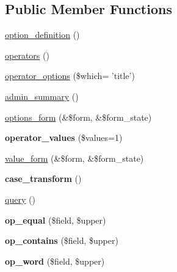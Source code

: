 \subsection*{Public Member Functions}
\begin{CompactItemize}
\item 
\hyperlink{classviews__handler__filter__string_12b7ca0453039900efde58e2c14bf0c8}{option\_\-definition} ()
\item 
\hyperlink{classviews__handler__filter__string_db301581372054e2f66faab09e47004e}{operators} ()
\item 
\hyperlink{classviews__handler__filter__string_9b6d71fc1698780860f2ec9ff84f2b46}{operator\_\-options} (\$which= 'title')
\item 
\hyperlink{classviews__handler__filter__string_3152b0f2ce38cf493327e2a91b9c9f5e}{admin\_\-summary} ()
\item 
\hyperlink{classviews__handler__filter__string_997cbe831f362c6d83a72b84471567fa}{options\_\-form} (\&\$form, \&\$form\_\-state)
\item 
\hypertarget{classviews__handler__filter__string_bd9ab34d0c4ba349e90af3b31207e203}{
\textbf{operator\_\-values} (\$values=1)}
\label{classviews__handler__filter__string_bd9ab34d0c4ba349e90af3b31207e203}

\item 
\hyperlink{classviews__handler__filter__string_41c2ed02d24685d046eccd9e751ad916}{value\_\-form} (\&\$form, \&\$form\_\-state)
\item 
\hypertarget{classviews__handler__filter__string_ba89fb2826a3a0c8eda170379127f69f}{
\textbf{case\_\-transform} ()}
\label{classviews__handler__filter__string_ba89fb2826a3a0c8eda170379127f69f}

\item 
\hyperlink{classviews__handler__filter__string_fcfdae379583a2eb912e1b82d4513503}{query} ()
\item 
\hypertarget{classviews__handler__filter__string_4962e23ff322591ec3bff1c5c3f5a538}{
\textbf{op\_\-equal} (\$field, \$upper)}
\label{classviews__handler__filter__string_4962e23ff322591ec3bff1c5c3f5a538}

\item 
\hypertarget{classviews__handler__filter__string_1a843f36ea8f0ef36964f978ad315361}{
\textbf{op\_\-contains} (\$field, \$upper)}
\label{classviews__handler__filter__string_1a843f36ea8f0ef36964f978ad315361}

\item 
\hypertarget{classviews__handler__filter__string_3db022f508d2a9741d38e8d15f2ba2d1}{
\textbf{op\_\-word} (\$field, \$upper)}
\label{classviews__handler__filter__string_3db022f508d2a9741d38e8d15f2ba2d1}


\end{CompactItemize}
